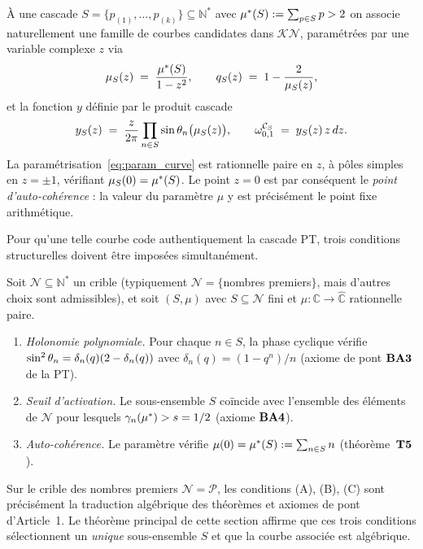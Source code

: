 À une cascade $S = \{p_{(1)}, \dots, p_{(k)}\} \subseteq \mathbb N^{*}$ avec $\mu^{*}(S) := \sum_{p \in S} p > 2$ on associe naturellement une famille de courbes candidates dans $\mathcal{KN}$, paramétrées par une variable complexe $z$ via
\begin{equation}
\mu_S(z) \;=\; \dfrac{\mu^{*}(S)}{1 - z^{2}},
\qquad
q_S(z) \;=\; 1 - \dfrac{2}{\mu_S(z)},
\label{eq:param_curve}
\end{equation}
et la fonction $y$ définie par le produit cascade
\begin{equation}
y_S(z) \;=\; \dfrac{z}{2\pi} \prod_{n \in S} \sin\theta_{n}\bigl(\mu_S(z)\bigr),
\qquad
\omega_{0,1}^{\mathcal C_S} \;=\; y_S(z)\,z\,dz.
\label{eq:y_S}
\end{equation}
La paramétrisation~\eqref{eq:param_curve} est rationnelle paire en $z$, à pôles simples en $z = \pm 1$, vérifiant $\mu_S(0) = \mu^{*}(S)$. Le point $z = 0$ est par conséquent le \emph{point d'auto-cohérence} : la valeur du paramètre $\mu$ y est précisément le point fixe arithmétique.

Pour qu'une telle courbe code authentiquement la cascade PT, trois conditions structurelles doivent être imposées simultanément.

\begin{definition}
\label{def:ABC}
Soit $\mathcal N \subseteq \mathbb N^{*}$ un crible (typiquement $\mathcal N = \{$nombres premiers$\}$, mais d'autres choix sont admissibles), et soit $(S, \mu)$ avec $S \subseteq \mathcal N$ fini et $\mu : \mathbb C \to \widehat{\mathbb C}$ rationnelle paire.
\begin{enumerate}[nosep,label=\textbf{(\Alph*)}]
\item \emph{Holonomie polynomiale.} Pour chaque $n \in S$, la phase cyclique vérifie $\sin^{2}\theta_{n} = \delta_n(q)(2 - \delta_n(q))$ avec $\delta_n(q) = (1 - q^{n})/n$ (axiome de pont $\textbf{BA3}$ de la PT).
\item \emph{Seuil d'activation.} Le sous-ensemble $S$ coïncide avec l'ensemble des éléments de $\mathcal N$ pour lesquels $\gamma_{n}(\mu^{*}) > s = 1/2$ (axiome $\textbf{BA4}$).
\item \emph{Auto-cohérence.} Le paramètre vérifie $\mu(0) = \mu^{*}(S) := \sum_{n \in S} n$ (théorème~$\textbf{T5}$).
\end{enumerate}
\end{definition}

Sur le crible des nombres premiers $\mathcal N = \mathcal P$, les conditions (A), (B), (C) sont précisément la traduction algébrique des théorèmes et axiomes de pont d'Article~1. Le théorème principal de cette section affirme que ces trois conditions sélectionnent un \emph{unique} sous-ensemble $S$ et que la courbe associée est algébrique.

